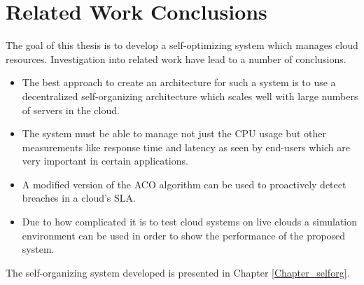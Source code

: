 \section{Related Work Conclusions}

The goal of this thesis is to develop a self-optimizing system which manages cloud resources. Investigation into related work have lead to a number of conclusions. 

\begin{itemize}
	\item The best approach to create an architecture for such a system is to use a decentralized self-organizing architecture which scales well with large numbers of servers in the cloud.
	\item The system must be able to manage not just the CPU usage but other measurements like response time and latency as seen by end-users which are very important in certain applications.
	\item A modified version of the ACO algorithm can be used to proactively detect breaches in a cloud's SLA.
	\item Due to how complicated it is to test cloud systems on live clouds a simulation environment can be used in order to show the performance of the proposed system. 
\end{itemize}

The self-organizing system developed is presented in Chapter \ref{Chapter_selforg}.